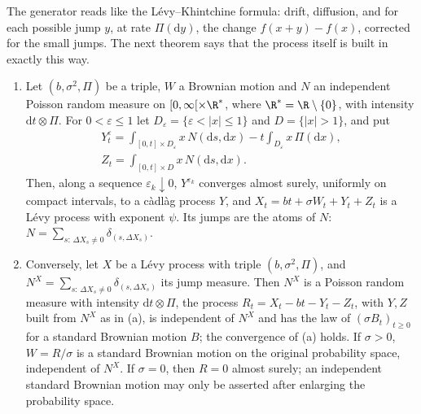 The generator reads like the L\'evy--Khintchine formula: drift, diffusion, and for each possible jump $y$, at rate $\Pi(\mathrm dy)$, the change $f(x+y)-f(x)$, corrected for the small jumps. The next theorem says that the process
itself is built in exactly this way.

\begin{theorem}[L\'evy--It\^o, 1934--1942]\label{thm:levyito}
\begin{enumerate}[label=(\alph*)]
\item Let $(b,\sigma^2,\Pi)$ be a triple, $W$ a Brownian motion and $N$ an independent Poisson random measure on $[0,\infty[\times\R^*$, where $\R^*=\R\setminus\{0\}$, with intensity $\mathrm dt\otimes\Pi$. For
$0<\varepsilon\le1$ let $D_\varepsilon=\{\varepsilon<|x|\le1\}$ and $D=\{|x|>1\}$, and put
\begin{gather*}
Y^\varepsilon_t=\int_{[0,t]\times D_\varepsilon}x\,N(\mathrm ds,\mathrm dx)-t\int_{D_\varepsilon}x\,\Pi(\mathrm dx),\\
Z_t=\int_{[0,t]\times D}x\,N(\mathrm ds,\mathrm dx).
\end{gather*}
Then, along a sequence $\varepsilon_k\downarrow0$, $Y^{\varepsilon_k}$ converges almost surely, uniformly on compact intervals, to a c\`adl\`ag process $Y$, and $X_t=bt+\sigma W_t+Y_t+Z_t$ is a L\'evy process with exponent $\psi$.
Its jumps are the atoms of $N$: $N=\sum_{s:\,\Delta X_s\ne0}\delta_{(s,\Delta X_s)}$.
\item Conversely, let $X$ be a L\'evy process with triple $(b,\sigma^2,\Pi)$, and $N^X=\sum_{s:\,\Delta X_s\ne0}\delta_{(s,\Delta X_s)}$ its jump measure. Then $N^X$ is a Poisson random measure with intensity $\mathrm dt\otimes\Pi$, the process $R_t=X_t-bt-Y_t-Z_t$, with $Y,Z$ built from $N^X$ as in (a), is independent of $N^X$ and has the law of $(\sigma B_t)_{t\ge0}$ for a standard Brownian motion $B$; the convergence of (a) holds.
If $\sigma>0$, $W=R/\sigma$ is a standard Brownian motion on the original probability space, independent of $N^X$. If $\sigma=0$, then $R=0$ almost surely; an independent standard Brownian motion may only be asserted after enlarging the probability space.
\end{enumerate}
\end{theorem}

